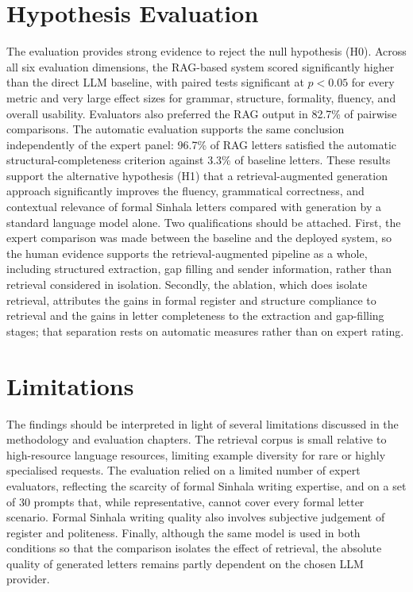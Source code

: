 \documentclass[12pt]{uomthesis}
\begin{document}
\section{Hypothesis Evaluation}
The evaluation provides strong evidence to reject the null hypothesis (H0). Across all six evaluation dimensions, the RAG-based system scored significantly higher than the direct LLM baseline, with paired tests significant at $p < 0.05$ for every metric and very large effect sizes for grammar, structure, formality, fluency, and overall usability. Evaluators also preferred the RAG output in 82.7\% of pairwise comparisons. The automatic evaluation supports the same conclusion independently of the expert panel: 96.7\% of RAG letters satisfied the automatic structural-completeness criterion against 3.3\% of baseline letters. These results support the alternative hypothesis (H1) that a retrieval-augmented generation approach significantly improves the fluency, grammatical correctness, and contextual relevance of formal Sinhala letters compared with generation by a standard language model alone. Two qualifications should be attached. First, the expert comparison was made between the baseline and the deployed system, so the human evidence supports the retrieval-augmented pipeline as a whole, including structured extraction, gap filling and sender information, rather than retrieval considered in isolation. Secondly, the ablation, which does isolate retrieval, attributes the gains in formal register and structure compliance to retrieval and the gains in letter completeness to the extraction and gap-filling stages; that separation rests on automatic measures rather than on expert rating.

\section{Limitations}
The findings should be interpreted in light of several limitations discussed in the methodology and evaluation chapters. The retrieval corpus is small relative to high-resource language resources, limiting example diversity for rare or highly specialised requests. The evaluation relied on a limited number of expert evaluators, reflecting the scarcity of formal Sinhala writing expertise, and on a set of 30 prompts that, while representative, cannot cover every formal letter scenario. Formal Sinhala writing quality also involves subjective judgement of register and politeness. Finally, although the same model is used in both conditions so that the comparison isolates the effect of retrieval, the absolute quality of generated letters remains partly dependent on the chosen LLM provider.
\end{document}
